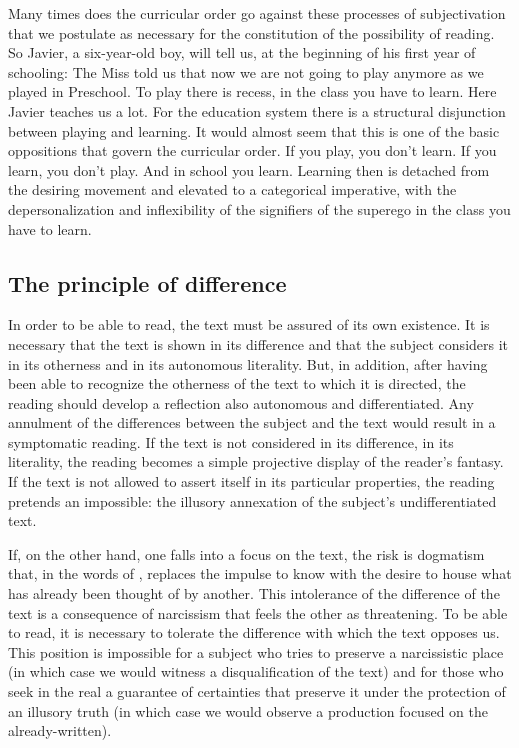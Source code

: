 \documentclass[english]{textolivre}
\begin{document}
Many times does the curricular order go against these processes of subjectivation that we postulate as necessary for the constitution of the possibility of reading. So Javier, a six-year-old boy, will tell us, at the beginning of his first year of schooling: The Miss told us that now we are not going to play anymore as we played in Preschool. To play there is recess, in the class you have to learn. Here Javier teaches us a lot. For the education system there is a structural disjunction between playing and learning. It would almost seem that this is one of the basic oppositions that govern the curricular order. If you play, you don't learn. If you learn, you don't play. And in school you learn. Learning then is detached from the desiring movement and elevated to a categorical imperative, with the depersonalization and inflexibility of the signifiers of the superego in the class you have to learn.

\subsection{The principle of difference}\label{sec-fmt-manuscrito}
In order to be able to read, the text must be assured of its own existence. It is necessary that the text is shown in its difference and that the subject considers it in its otherness and in its autonomous literality. But, in addition, after having been able to recognize the otherness of the text to which it is directed, the reading should develop a reflection also autonomous and differentiated. Any annulment of the differences between the subject and the text would result in a symptomatic reading. If the text is not considered in its difference, in its literality, the reading becomes a simple projective display of the reader's fantasy. If the text is not allowed to assert itself in its particular properties, the reading pretends an impossible: the illusory annexation of the subject's undifferentiated text.

If, on the other hand, one falls into a focus on the text, the risk is dogmatism that, in the words of \textcite{hornstein_aulagnier:_1994}, replaces the impulse to know with the desire to house what has already been thought of by another. This intolerance of the difference of the text is a consequence of narcissism that feels the other as threatening. To be able to read, it is necessary to tolerate the difference with which the text opposes us. This position is impossible for a subject who tries to preserve a narcissistic place (in which case we would witness a disqualification of the text) and for those who seek in the real a guarantee of certainties that preserve it under the protection of an illusory truth (in which case we would observe a production focused on the already-written).
\end{document}

